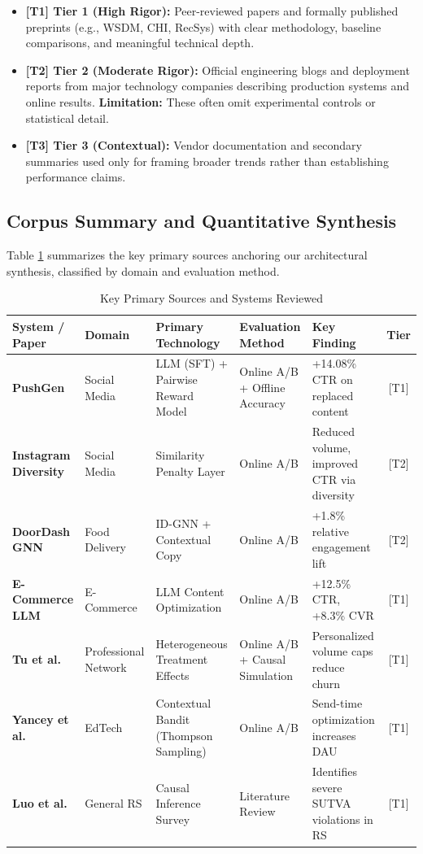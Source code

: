 \documentclass[sigconf]{acmart}
\begin{document}
\begin{itemize}
    \item \textbf{[T1] Tier 1 (High Rigor):} Peer-reviewed papers and formally published preprints (e.g., WSDM, CHI, RecSys) with clear methodology, baseline comparisons, and meaningful technical depth.
    \item \textbf{[T2] Tier 2 (Moderate Rigor):} Official engineering blogs and deployment reports from major technology companies describing production systems and online results. \textbf{Limitation:} These often omit experimental controls or statistical detail.
    \item \textbf{[T3] Tier 3 (Contextual):} Vendor documentation and secondary summaries used only for framing broader trends rather than establishing performance claims.
\end{itemize}

\subsection{Corpus Summary and Quantitative Synthesis}

Table \ref{tab:corpus} summarizes the key primary sources anchoring our architectural synthesis, classified by domain and evaluation method. 

\begin{table}[t]
\caption{Key Primary Sources and Systems Reviewed}
\label{tab:corpus}
\begin{tabular}{p{2.5cm}p{2cm}p{4cm}p{3cm}p{3cm}c}
\toprule
\textbf{System / Paper} & \textbf{Domain} & \textbf{Primary Technology} & \textbf{Evaluation Method} & \textbf{Key Finding} & \textbf{Tier} \\
\midrule
\textbf{PushGen \cite{bie2026pushgen}} & Social Media & LLM (SFT) + Pairwise Reward Model & Online A/B + Offline Accuracy & +14.08\% CTR on replaced content & [T1] \\
\textbf{Instagram Diversity \cite{sun2025ranking}} & Social Media & Similarity Penalty Layer & Online A/B & Reduced volume, improved CTR via diversity & [T2] \\
\textbf{DoorDash GNN \cite{sinha2024doordash}} & Food Delivery & ID-GNN + Contextual Copy & Online A/B & +1.8\% relative engagement lift & [T2] \\
\textbf{E-Commerce LLM \cite{acm2025ecommerce}} & E-Commerce & LLM Content Optimization & Online A/B & +12.5\% CTR, +8.3\% CVR & [T1] \\
\textbf{Tu et al. \cite{tu2021personalized}} & Professional Network & Heterogeneous Treatment Effects & Online A/B + Causal Simulation & Personalized volume caps reduce churn & [T1] \\
\textbf{Yancey et al. \cite{yancey2020sleeping}} & EdTech & Contextual Bandit (Thompson Sampling) & Online A/B & Send-time optimization increases DAU & [T1] \\
\textbf{Luo et al. \cite{luo2024survey}} & General RS & Causal Inference Survey & Literature Review & Identifies severe SUTVA violations in RS & [T1] \\
\bottomrule
\end{tabular}
\end{table}
\end{document}
